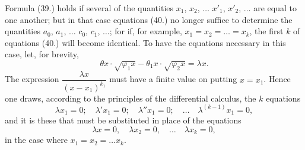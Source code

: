 \documentclass{article}
\begin{document}
Formula (39.) holds if several of the quantities $x_1$, $x_2$, $\ldots$ $x'_1$, $x'_2$, $\ldots$ are equal to one another; but in that case equations (40.) no longer suffice to determine the quantities $a_0$, $a_1$, $\ldots$ $c_0$, $c_1$, $\ldots$; for if, for example, $x_1 = x_2 = \ldots = x_k$, the first $k$ of equations (40.) will become identical. To have the equations necessary in this case, let, for brevity,
\[ \theta x \cdot \sqrt{\varphi_1 x} - \theta_1 x \cdot \sqrt{\varphi_2 x} = \lambda x. \]
The expression $\dfrac{\lambda x}{(x-x_1)^{k_1}}$ must have a finite value on putting $x = x_1$. Hence one draws, according to the principles of the differential calculus, the $k$ equations
\[ \lambda x_1 = 0; \quad \lambda'x_1 = 0; \quad \lambda''x_1 = 0; \quad \ldots \quad \lambda^{(k-1)}x_1 = 0, \tag{42} \]
and it is these that must be substituted in place of the equations
\[ \lambda x = 0, \quad \lambda x_2 = 0, \quad \ldots \quad \lambda x_k = 0, \]
in the case where $x_1 = x_2 = \ldots x_k$.
\end{document}
